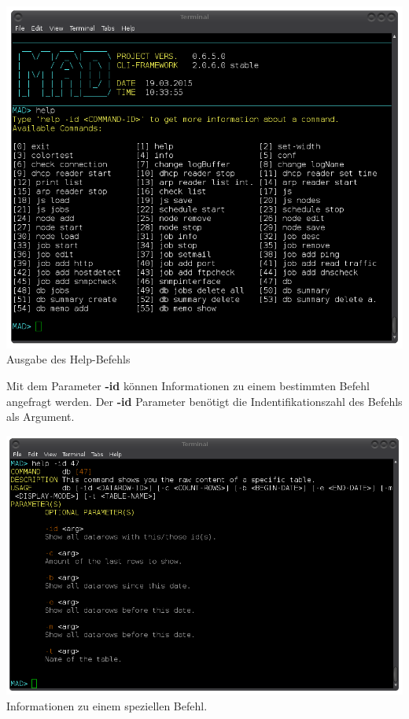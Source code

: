 \documentclass[12pt,a4paper]{report}
\begin{document}
\begin{onehalfspace}
\begin{center}
\includegraphics[scale=0.5]{img/cli_help.png}\\
Ausgabe des Help-Befehls
\end{center}

Mit dem Parameter \textbf{-id} können Informationen zu einem bestimmten Befehl angefragt werden. Der \textbf{-id} Parameter benötigt die Indentifikationszahl des Befehls als Argument.

\begin{center}
\includegraphics[scale=0.5]{img/cli_help_id.png}\\
Informationen zu einem speziellen Befehl.
\end{center}


\end{onehalfspace}
\end{document}
